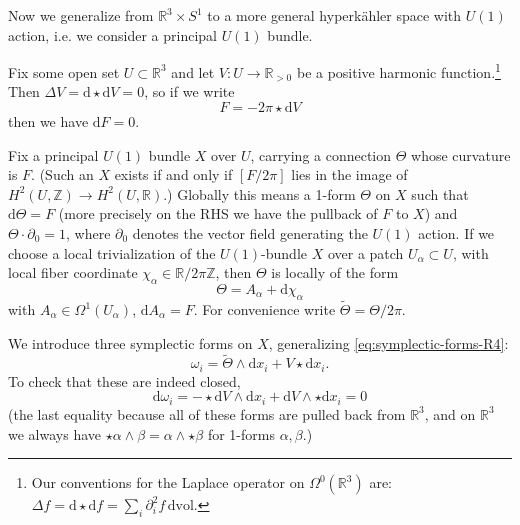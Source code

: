 \documentclass[12pt,letterpaper,reqno]{amsart}
\numberwithin{equation}{section}
\newcommand{\R}{\ensuremath{\mathbb R}}
\newcommand{\Z}{\ensuremath{\mathbb Z}}
\newcommand{\hk}{hyperk\"ahler\xspace}
\newcommand{\de}{\mathrm{d}}
\newcommand{\vol}{\mathrm{vol}}
\begin{document}
\begin{example} \label{exa:incomplete-gibbons-hawking}
Now we generalize from $\R^3 \times S^1$ to a more general
\hk space with $U(1)$ action, i.e. we consider a principal
$U(1)$ bundle.

Fix some open set $U \subset \R^3$ and
let $V: U \to \R_{>0}$ be a positive harmonic function.\footnote{Our
conventions for the Laplace operator on $\Omega^0(\R^3)$ are:
$\Delta f = \de \star \de f = \sum_i \partial_i^2 f \, \de \vol$.}
Then $\Delta V = \de \star \de V = 0$, so if we write
\begin{equation}
  F = -2 \pi \star \de V
\end{equation}
then we have $\de F = 0$. 

Fix a principal $U(1)$ bundle $X$ over $U$, carrying a connection
$\Theta$ whose curvature is $F$.
(Such an $X$ exists if and only if $[F/2\pi]$ lies in 
the image of $H^2(U,\Z) \to H^2(U,\R)$.) 
Globally this means a 1-form $\Theta$ on $X$
such that $\de \Theta = F$ (more precisely on the RHS we have
the pullback of $F$ to $X$) and $\Theta \cdot \partial_0 = 1$,
where $\partial_0$ denotes the vector field generating
the $U(1)$ action.
If we choose a local
trivialization of the $U(1)$-bundle $X$ over a patch
$U_\alpha \subset U$, with local 
fiber coordinate $\chi_{\alpha} \in \R / 2 \pi \Z$, then $\Theta$ 
is locally of the form
\begin{equation}
 \Theta = A_\alpha + \de \chi_{\alpha} 
\end{equation}
with $A_\alpha \in \Omega^1(U_\alpha)$, $\de A_\alpha = F$.
\newcommand{\tTheta}{\tilde\Theta}
For convenience write $\tTheta = \Theta / 2\pi$.

We introduce three symplectic forms on $X$,
generalizing \eqref{eq:symplectic-forms-R4}:
\begin{equation}
  \omega_i = \tTheta \wedge \de x_i + V \star \de x_i.
\end{equation}
To check that these are indeed closed,
\begin{equation}
  \de \omega_i = - \star \de V \wedge \de x_i + \de V \wedge \star \de x_i = 0
\end{equation}
(the last equality because all of these forms are pulled back
from $\R^3$, and on $\R^3$ we always have $\star \alpha \wedge \beta = \alpha \wedge \star \beta$ for 1-forms $\alpha, \beta$.)


\end{example}
\end{document}
